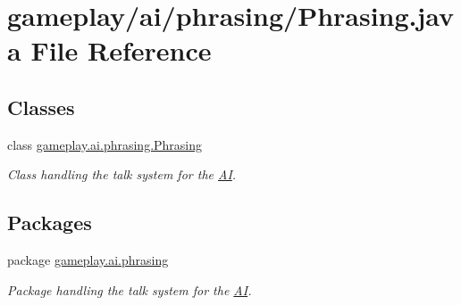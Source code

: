 \hypertarget{a00050}{\section{gameplay/ai/phrasing/\-Phrasing.java File Reference}
\label{a00050}
}
\subsection*{Classes}
\begin{DoxyCompactItemize}
\item 
class \hyperlink{a00018}{gameplay.\-ai.\-phrasing.\-Phrasing}
\begin{DoxyCompactList}\small\item\em Class handling the talk system for the \hyperlink{a00001}{A\-I}. \end{DoxyCompactList}\end{DoxyCompactItemize}
\subsection*{Packages}
\begin{DoxyCompactItemize}
\item 
package \hyperlink{a00084}{gameplay.\-ai.\-phrasing}
\begin{DoxyCompactList}\small\item\em Package handling the talk system for the \hyperlink{a00001}{A\-I}. \end{DoxyCompactList}\end{DoxyCompactItemize}
